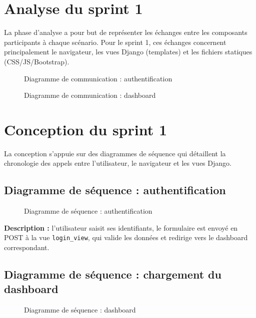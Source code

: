 \section{Analyse du sprint 1}
La phase d'analyse a pour but de représenter les échanges entre les composants
participants à chaque scénario. Pour le sprint 1, ces échanges concernent principalement
le navigateur, les vues Django (templates) et les fichiers statiques (CSS/JS/Bootstrap).

\begin{figure}[h!]
\centering
{}
\caption{Diagramme de communication : authentification}
\label{fig:comm-auth}
\end{figure}

\begin{figure}[h!]
\centering
{}
\caption{Diagramme de communication : dashboard}
\label{fig:comm-dash}
\end{figure}

\section{Conception du sprint 1}
La conception s'appuie sur des diagrammes de séquence qui détaillent la chronologie
des appels entre l'utilisateur, le navigateur et les vues Django.

\subsection{Diagramme de séquence : authentification}
\begin{figure}[h!]
\centering
{}
\caption{Diagramme de séquence : authentification}
\label{fig:seq-auth}
\end{figure}

\textbf{Description :} l'utilisateur saisit ses identifiants, le formulaire est envoyé
en POST à la vue \texttt{login\_view}, qui valide les données et redirige vers le
dashboard correspondant.

\subsection{Diagramme de séquence : chargement du dashboard}
\begin{figure}[h!]
\centering
{}
\caption{Diagramme de séquence : dashboard}
\label{fig:seq-dash}
\end{figure}

